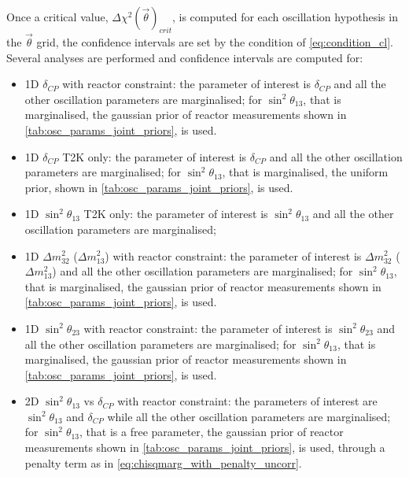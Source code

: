 Once a critical value, $\Delta \chi^2 (\vec{\theta})_{crit}$,
is computed for each oscillation hypothesis in the $\vec{\theta}$ grid,
the confidence intervals are set by the condition of \cref{eq:condition_cl}. \\


Several analyses are performed and confidence intervals are computed for:
\begin{itemize}

\item 
1D $\delta_{CP}$ with reactor constraint: 
the parameter of interest is $\delta_{CP}$ and
all the other oscillation parameters are marginalised;
for $\sin^2 \theta_{13}$, that is marginalised,
the gaussian prior of reactor measurements shown in \cref{tab:osc_params_joint_priors}, is used. 

\item 
1D $\delta_{CP}$ T2K only: 
the parameter of interest is $\delta_{CP}$ and
all the other oscillation parameters are marginalised;
for $\sin^2 \theta_{13}$, that is marginalised, 
the uniform prior, shown in \cref{tab:osc_params_joint_priors}, is used. 

\item 
1D $\sin^2 \theta_{13}$ T2K only: 
the parameter of interest is $\sin^2 \theta_{13}$ and
all the other oscillation parameters are marginalised;

\item 
1D $\Delta m^2_{32}$ ($\Delta m^2_{13}$) with reactor constraint: 
the parameter of interest is $\Delta m^2_{32}$ ($\Delta m^2_{13}$) and
all the other oscillation parameters are marginalised;
for $\sin^2 \theta_{13}$, that is marginalised,
the gaussian prior of reactor measurements shown in \cref{tab:osc_params_joint_priors}, is used. 

\item 
1D $\sin^2 \theta_{23}$ with reactor constraint: 
the parameter of interest is $\sin^2 \theta_{23}$ and
all the other oscillation parameters are marginalised;
for $\sin^2 \theta_{13}$, that is marginalised,
the gaussian prior of reactor measurements shown in \cref{tab:osc_params_joint_priors}, is used. 

%

\item 
2D $\sin^2 \theta_{13}$ vs $\delta_{CP}$ with reactor constraint: 
the parameters of interest are $\sin^2 \theta_{13}$ and $\delta_{CP}$ while
all the other oscillation parameters are marginalised;
for $\sin^2 \theta_{13}$, that is a free parameter, 
the gaussian prior of reactor measurements shown in \cref{tab:osc_params_joint_priors}, 
is used, through a penalty term as in \cref{eq:chisqmarg_with_penalty_uncorr}.


\end{itemize}
